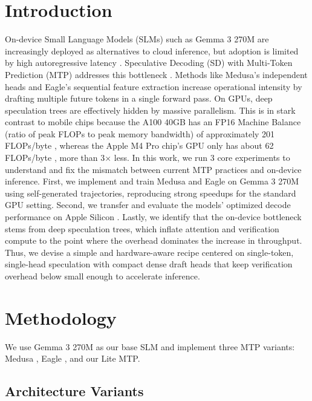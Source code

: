 \documentclass{article} %
\begin{document}
\section{Introduction}

On-device Small Language Models (SLMs) such as Gemma 3 270M are increasingly deployed as alternatives to cloud inference, but adoption is limited by high autoregressive latency \citep{williams2009roofline}. Speculative Decoding (SD) with Multi-Token Prediction (MTP) addresses this bottleneck \citep{leviathan2023fast, chen2023accelerating, gloeckle2024better}. Methods like Medusa's independent heads \citep{cai2024medusa} and Eagle's sequential feature extraction \citep{li2024eagle} increase operational intensity by drafting multiple future tokens in a single forward pass. On GPUs, deep speculation trees \citep{miao2024specinfer} are effectively hidden by massive parallelism. This is in stark contrast to mobile chips because the A100 40GB has an FP16 Machine Balance (ratio of peak FLOPs to peak memory bandwidth) of approximately 201 FLOPs/byte \citep{nvidia2020a100}, whereas the Apple M4 Pro chip's GPU only has about 62 FLOPs/byte \citep{apple2024m4}, more than 3$\times$ less. In this work, we run 3 core experiments to understand and fix the mismatch between current MTP practices and on-device inference. First, we implement and train Medusa and Eagle on Gemma 3 270M using self-generated trajectories, reproducing strong speedups for the standard GPU setting. Second, we transfer and evaluate the models' optimized decode performance on Apple Silicon \citep{hannun2023mlx}. Lastly, we identify that the on-device bottleneck stems from deep speculation trees, which inflate attention and verification compute to the point where the overhead dominates the increase in throughput. Thus, we devise a simple and hardware-aware recipe centered on single-token, single-head speculation with compact dense draft heads that keep verification overhead below small enough to accelerate inference.

\section{Methodology}

We use Gemma 3 270M as our base SLM and implement three MTP variants: Medusa \citep{cai2024medusa}, Eagle \citep{li2024eagle}, and our Lite MTP.

\subsection{Architecture Variants}
\end{document}
